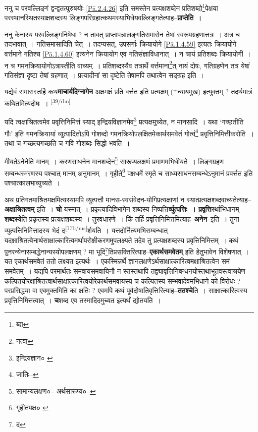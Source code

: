 \documentclass[article,12pt,a4paper]{memoir}
\newcommand{\add}[1]{($^{+}$#1)}
\begin{document}
	  \pstart ननु च परवल्लिङ्गं द्वन्द्वतत्पुरुषयोः \cref{Pā.2.4.26} इति समस्तेन प्रत्यक्षशब्देन प्रतिशब्दो\footnote{ब्दा}पेक्षया परस्थानस्थितस्याक्षशब्दस्य लिङ्गपरिग्रहात्कथमस्याभिधेयवल्लिङ्गतेत्याह--\textbf{प्राप्तेति} ।
	\pend
      

	  \pstart ननु केनास्य परवल्लिङ्गनिषेधः ? न तावत् प्राप्तापन्नालङ्गतिसमासेन तेषां स्वरूपग्रहणात्तत्र । अत्र च तदभावात् । गतिसमासादिति चेत् । तदप्यसत्, उपसर्गाः क्रियायोगे \cref{Pā.1.4.59} इत्यतः क्रियायोगे वर्त्तमाने गतिश्च \cref{Pā.1.4.60} इत्यनेन क्रियायोग एव गतिसंज्ञाविधानात् । न चायं प्रतिशब्दः क्रियायोगी । न च गमनक्रियायोगोऽत्रास्तीति वाच्यम् । प्रतिशब्दस्यैव तत्रार्थे वर्त्तमाना\footnote{नत्वा}त् नायं दोषः, गतिग्रहणेन तत्र येषां गतिसंज्ञा दृष्टा तेषां ग्रहणात् । प्रत्यादीनां सा दृष्टेति तेषामपि तथात्वेन सङ्ग्रह इति ।
	\pend
      

	  \pstart यद्येवं समासस्तर्हि कथ\textbf{माचार्यदिग्नागेन} अक्षमक्षं प्रति वर्त्तत इति प्रत्यक्षम् \add{न्यायमुख} इत्युक्तम् ? तदर्थमात्रं कथितमित्यदोषः ।
	\pend
      \leavevmode\textsuperscript{\rmlatinfont\tiny [39/dm]}

	  \pstart यदि त्वक्षाश्रितत्वमेव प्रवृत्तिनिमित्तं स्याद् इन्द्रियविज्ञानमेव\footnote{इन्द्रियज्ञान० \cite{dp-msA} \cite{dp-edP} \cite{dp-edH} \cite{dp-edE}} प्रत्यक्षमुच्येत, न मानसादि । यथा ‘गच्छतीति गौः’ इति गमनक्रियायां व्युत्पादितोऽपि गोशब्दो गमनक्रियोपलक्षितमेकार्थसमवेतं गोत्वं\footnote{जातिः--\cite{dp-msD-n}} प्रवृत्तिनिमित्तीकरोति । तथा च गच्छत्यगच्छति च गवि गोशब्दः सिद्धो भवति ।
	\pend
       

	  \pstart मीयतेऽनेनेति मानम् । करणसाधनेन मानशब्देन\footnote{सामान्यलक्षण०--\cite{dp-msD-n} अर्थसारूप्य०--\cite{dp-msD-n}} सारूप्यलक्षणं प्रमाणमभिधीयते । लिङ्गग्रहण सम्बन्धस्मरणस्य पश्चात् मानम् अनुमानम् । गृहीते\footnote{गृहीतपक्ष० \cite{dp-msB}} पक्षधर्मे स्मृते च साध्यसाधनसम्बन्धेऽनुमानं प्रवर्त्तत इति पश्चात्कालभाव्युच्यते ।
	\pend
      

	  \pstart अथ प्रतिगतमाश्रितमक्षमित्यस्यामपि व्युत्पत्तौ मानस-स्वसंवेदन-योगिप्रत्यक्षाणां न स्यात्प्रत्यक्षशब्दवाच्यतेत्याह--\textbf{अक्षाश्रितत्वम्} इति । \textbf{चो} यस्मात् । प्रकृत्यादिविभागेन शब्दस्य निष्पत्ति\textbf{र्व्युत्पत्तिः । प्रवृत्ति}रर्थाभिधानम् \textbf{शब्दस्ये}ति प्रकृतस्य प्रत्यक्षशब्दस्य । तुरवधारणे । किं तर्हि प्रवृत्तिनिमित्तमित्याह--\textbf{अनेन}--इति । तुना व्युत्पत्तिनिमित्तादस्य भेदं द\leavevmode\textsuperscript{\rmlatinfont\tiny [17b/ms]}र्शयति । यत्तदोर्नित्यमभिसम्बन्धात् यदक्षाश्रितत्वेनार्थसाक्षात्कारित्वमर्थापरोक्षीकरणमुपलक्ष्यते तदेव तु प्रत्यक्षशब्दस्य प्रवृत्तिनिमित्तम् । कथं पुनरन्येनासम्बद्धेनान्यस्योपलक्षणम् ? मा भूदि\footnote{द}तिप्रसक्तिरित्याह--\textbf{एकार्थसमवेतम्} इति हेतुभावेन विशेषणात् । यत एकार्थसमवेतं ततो लक्ष्यत इत्यर्थः । एकस्मिन्नर्थे ज्ञानलक्षणेऽर्थसाक्षात्कारित्वमक्षाश्रितत्वेन समं समवेतम् । यद्यपि परमार्थतः समवायसमवायिनौ न स्तस्तथापि तद्व्यावृत्तिनिबन्धनयोस्तथाभूतवस्त्वाश्रयेण कल्पितयोरक्षाश्रितत्वार्थसाक्षात्कारित्वयोरेकार्थसमवायस्य च कल्पितस्य सम्भवादेवमभिधाने को विरोधः ? परप्रसिद्ध्या वा एवमुक्तमिति का क्षतिः ? एवमपि कथं पूर्वदोषातिवृत्तिरित्याह--\textbf{ततश्चे}ति । साक्षात्कारित्वस्य प्रवृत्तिनिमित्तत्वात् । \textbf{च}शब्द एव तस्मादिदमुच्यत इत्यर्थं द्योतयति ।
	\pend
      
\end{document}
